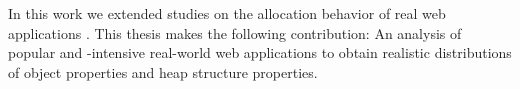 In this work we extended studies on the allocation behavior of real \JS web
applications \cite{JSMeter2009}. This thesis makes the following contribution:
An analysis of popular and \JS-intensive real-world web applications to obtain
realistic distributions of object properties and heap structure properties.

